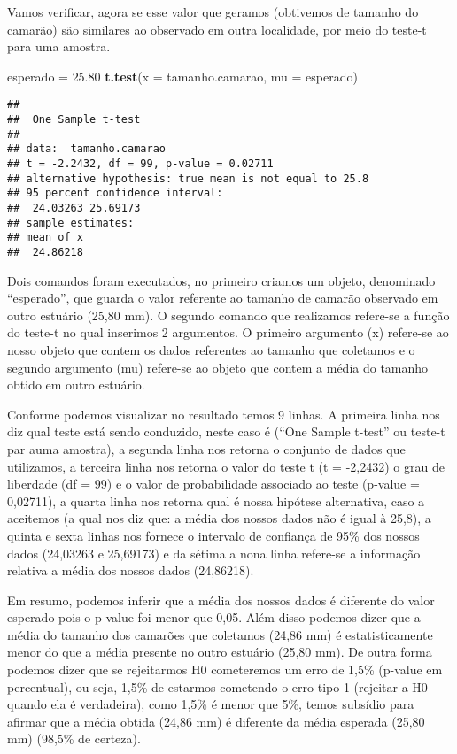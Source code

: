 \documentclass[]{book}
\newenvironment{Shaded}{\begin{snugshade}}{\end{snugshade}}
\newcommand{\DataTypeTok}[1]{\textcolor[rgb]{0.13,0.29,0.53}{#1}}
\newcommand{\FloatTok}[1]{\textcolor[rgb]{0.00,0.00,0.81}{#1}}
\newcommand{\KeywordTok}[1]{\textcolor[rgb]{0.13,0.29,0.53}{\textbf{#1}}}
\newcommand{\NormalTok}[1]{#1}
\newcommand{\StringTok}[1]{\textcolor[rgb]{0.31,0.60,0.02}{#1}}
\begin{document}
Vamos verificar, agora se esse valor que geramos (obtivemos de tamanho do camarão) são similares ao observado em outra localidade, por meio do teste-t para uma amostra.

\begin{Shaded}
\begin{Highlighting}[]
\NormalTok{esperado =}\StringTok{ }\FloatTok{25.80}
\KeywordTok{t.test}\NormalTok{(}\DataTypeTok{x =}\NormalTok{ tamanho.camarao, }\DataTypeTok{mu =}\NormalTok{ esperado)}
\end{Highlighting}
\end{Shaded}

\begin{verbatim}
## 
##  One Sample t-test
## 
## data:  tamanho.camarao
## t = -2.2432, df = 99, p-value = 0.02711
## alternative hypothesis: true mean is not equal to 25.8
## 95 percent confidence interval:
##  24.03263 25.69173
## sample estimates:
## mean of x 
##  24.86218
\end{verbatim}

Dois comandos foram executados, no primeiro criamos um objeto, denominado ``esperado'', que guarda o valor referente ao tamanho de camarão observado em outro estuário (25,80 mm). O segundo comando que realizamos refere-se a função do teste-t no qual inserimos 2 argumentos. O primeiro argumento (x) refere-se ao nosso objeto que contem os dados referentes ao tamanho que coletamos e o segundo argumento (mu) refere-se ao objeto que contem a média do tamanho obtido em outro estuário.

Conforme podemos visualizar no resultado temos 9 linhas. A primeira linha nos diz qual teste está sendo conduzido, neste caso é (``One Sample t-test'' ou teste-t par auma amostra), a segunda linha nos retorna o conjunto de dados que utilizamos, a terceira linha nos retorna o valor do teste t (t = -2,2432) o grau de liberdade (df = 99) e o valor de probabilidade associado ao teste (p-value = 0,02711), a quarta linha nos retorna qual é nossa hipótese alternativa, caso a aceitemos (a qual nos diz que: a média dos nossos dados não é igual à 25,8), a quinta e sexta linhas nos fornece o intervalo de confiança de 95\% dos nossos dados (24,03263 e 25,69173) e da sétima a nona linha refere-se a informação relativa a média dos nossos dados (24,86218).

Em resumo, podemos inferir que a média dos nossos dados é diferente do valor esperado pois o p-value foi menor que 0,05. Além disso podemos dizer que a média do tamanho dos camarões que coletamos (24,86 mm) é estatisticamente menor do que a média presente no outro estuário (25,80 mm). De outra forma podemos dizer que se rejeitarmos H0 cometeremos um erro de 1,5\% (p-value em percentual), ou seja, 1,5\% de estarmos cometendo o erro tipo 1 (rejeitar a H0 quando ela é verdadeira), como 1,5\% é menor que 5\%, temos subsídio para afirmar que a média obtida (24,86 mm) é diferente da média esperada (25,80 mm) (98,5\% de certeza).
\end{document}
